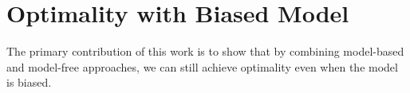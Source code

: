 \documentclass{article} %
\begin{document}

\section{Optimality with Biased Model}
The primary contribution of this work is to show that by combining model-based and 
model-free approaches, we can still achieve optimality even when the model is biased.
\end{document}

